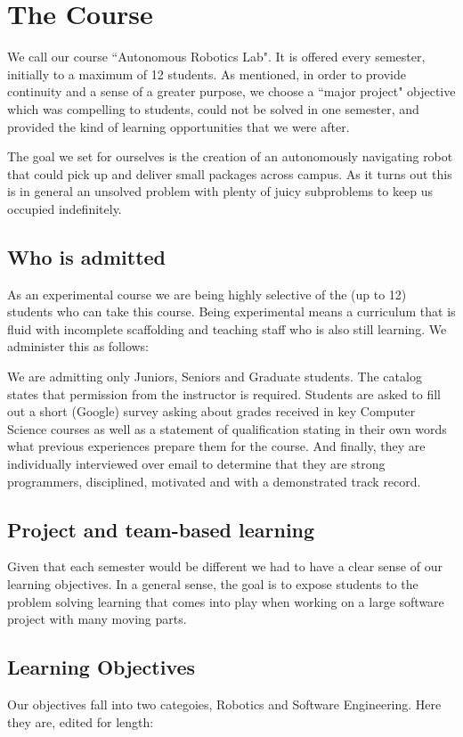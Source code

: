 \section{The Course}

We call our course ``Autonomous Robotics Lab". It is offered every semester, initially to a maximum of 12 students. As mentioned, in order to provide continuity and a sense of a greater purpose, we choose a ``major project" objective which was compelling to students, could not be solved in one semester, and provided the kind of learning opportunities that we were after. 

The goal we set for ourselves is the creation of an autonomously navigating robot that could pick up and deliver small packages across campus. As it turns out this is in general an unsolved problem with plenty of juicy subproblems to keep us occupied indefinitely.

\subsection{Who is admitted} As an experimental course we are being highly selective of the (up to 12) students who can take this course. Being experimental means a curriculum that is fluid with incomplete scaffolding and teaching staff who is also still learning. We administer this as follows:

We are admitting only Juniors, Seniors and Graduate students. The catalog states that permission from the instructor is required. Students are asked to fill out a short (Google) survey asking about grades received in key Computer Science courses as well as a statement of qualification stating in their own words what previous experiences prepare them for the course. And finally, they are individually interviewed over email to determine that they are strong programmers, disciplined, motivated and with a demonstrated track record.

\subsection{Project and team-based learning} Given that each semester would be different we had to have a clear sense of our learning objectives. In a general sense, the goal is to expose students to the problem solving learning that comes into play when working on a large software project with many moving parts.

\subsection{Learning Objectives} Our objectives fall into two categoies, Robotics and Software Engineering. Here they are, edited for length:

